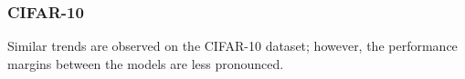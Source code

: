\subsubsection{CIFAR-10}
\begin{table}[htbp]
    \centering
    \vspace{0.5em}
    \caption{Comparison of models' accuracy on the CIFAR-10 dataset}
\end{table}
Similar trends are observed on the CIFAR-10 dataset; however, the performance margins between the models are less pronounced.
